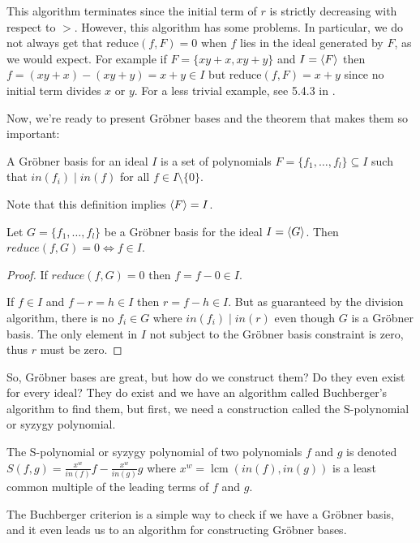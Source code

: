 \documentclass{article}
\theoremstyle{changedot}
\theoremstyle{changedotbreak}
\theoremstyle{nonumberplain}
\newtheorem{proof}{Proof}
\DeclarePairedDelimiter{\tuple}{\langle}{\rangle}
\DeclareMathOperator{\lcm}{lcm}
\begin{document}
This algorithm terminates since the initial term of $r$ is strictly decreasing with respect to $>$. However, this algorithm has some problems. In particular, we do not always get that $\text{reduce}(f, F) = 0$ when $f$ lies in the ideal generated by $F$, as we would expect. For example if $F = \{xy+x, xy+y\}$ and $I = \tuple{F}$ then $f = (xy+x) - (xy+y) = x+y \in I$ but $\text{reduce}(f, F) = x+y$ since no initial term divides $x$ or $y$. For a less trivial example, see 5.4.3 in \cite{NL}.

Now, we're ready to present Gröbner bases and the theorem that makes them so important:

\begin{definition}
  A Gröbner basis for an ideal $I$ is a set of polynomials $F = \{f_{1}, \dots, f_{l}\} \subseteq I$ such that $in(f_{i}) \mid in(f)$ for all $f \in I\setminus \{0\}$.
\end{definition}
Note that this definition implies $\tuple F = I$.

\begin{theorem}
  Let $G = \{f_{1}, \dots, f_{l}\}$ be a Gröbner basis for the ideal $I = \tuple{G}$. Then $reduce(f, G) = 0 \Longleftrightarrow f \in I$.
\end{theorem}
\begin{proof}
  If $reduce(f, G) = 0$ then $f = f - 0 \in I$.

  If $f \in I$ and $f - r = h \in I$ then $r = f - h \in I$. But as guaranteed by the division algorithm, there is no $f_{i} \in G$ where $in(f_{i}) \mid in(r)$ even though $G$ is a Gröbner basis. The only element in $I$ not subject to the Gröbner basis constraint is zero, thus $r$ must be zero.
\end{proof}

So, Gröbner bases are great, but how do we construct them? Do they even exist for every ideal? They do exist and we have an algorithm called Buchberger's algorithm to find them, but first, we need a construction called the S-polynomial or syzygy polynomial.

\begin{definition}
  The S-polynomial or syzygy polynomial of two polynomials $f$ and $g$ is denoted $S(f, g) = \frac{x^{w}}{in(f)} f - \frac{x^{w}}{in(g)} g$ where $x^{w} = \lcm(in(f), in(g))$ is a least common multiple of the leading terms of $f$ and $g$.
\end{definition}

The Buchberger criterion is a simple way to check if we have a Gröbner basis, and it even leads us to an algorithm for constructing Gröbner bases.
\end{document}

